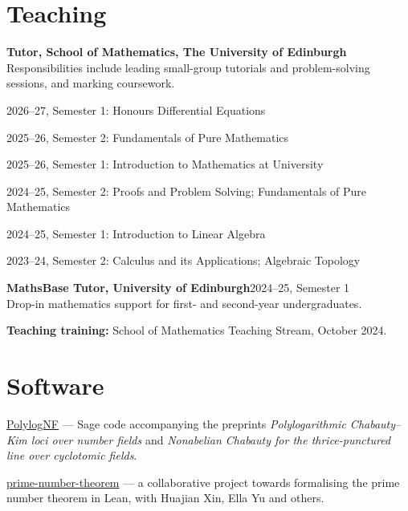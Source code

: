 \documentclass[11pt,a4paper]{article}
\begin{document}
\section*{Teaching}
\textbf{Tutor, School of Mathematics, The University of Edinburgh}\\
Responsibilities include leading small-group tutorials and problem-solving sessions, and marking coursework.
\begin{cvlist}
  \item 2026--27, Semester 1: Honours Differential Equations
  \item 2025--26, Semester 2: Fundamentals of Pure Mathematics
  \item 2025--26, Semester 1: Introduction to Mathematics at University
  \item 2024--25, Semester 2: Proofs and Problem Solving; Fundamentals of Pure Mathematics
  \item 2024--25, Semester 1: Introduction to Linear Algebra
  \item 2023--24, Semester 2: Calculus and its Applications; Algebraic Topology
\end{cvlist}

\vspace{6pt}
{\textbf{MathsBase Tutor, University of Edinburgh}\hfill 2024--25, Semester 1\\[1pt]
Drop-in mathematics support for first- and second-year undergraduates.\par}\vspace{6pt}

\textbf{Teaching training:} School of Mathematics Teaching Stream, October 2024.

\section*{Software}
\begin{cvlist}
  \item \href{https://github.com/martinluedtke/PolylogNF}{PolylogNF} ---
        Sage code accompanying the preprints \emph{Polylogarithmic Chabauty--Kim loci over number fields} and \emph{Nonabelian Chabauty for the thrice-punctured line over cyclotomic fields}.
  \item \href{https://github.com/xinhjBrant/prime-number-theorem}{prime-number-theorem} ---
        a collaborative project towards formalising the prime number theorem in Lean, with Huajian Xin, Ella Yu and others.
\end{cvlist}
\end{document}
